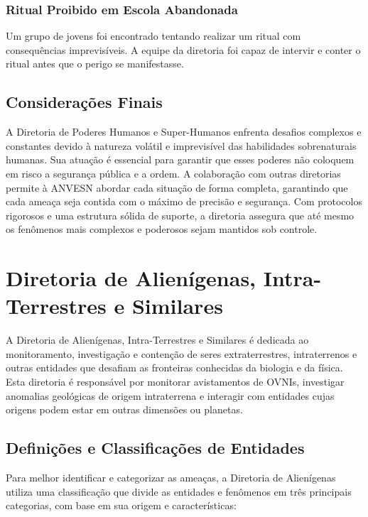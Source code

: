 \subsection{Ritual Proibido em Escola Abandonada}
Um grupo de jovens foi encontrado tentando realizar um ritual com consequências imprevisíveis. A equipe da diretoria foi capaz de intervir e conter o ritual antes que o perigo se manifestasse.

\section{Considerações Finais}

A Diretoria de Poderes Humanos e Super-Humanos enfrenta desafios complexos e constantes devido à natureza volátil e imprevisível das habilidades sobrenaturais humanas. Sua atuação é essencial para garantir que esses poderes não coloquem em risco a segurança pública e a ordem. A colaboração com outras diretorias permite à ANVESN abordar cada situação de forma completa, garantindo que cada ameaça seja contida com o máximo de precisão e segurança. Com protocolos rigorosos e uma estrutura sólida de suporte, a diretoria assegura que até mesmo os fenômenos mais complexos e poderosos sejam mantidos sob controle.



\chapter{Diretoria de Alienígenas, Intra-Terrestres e Similares}
A Diretoria de Alienígenas, Intra-Terrestres e Similares é dedicada ao monitoramento, investigação e contenção de seres extraterrestres, intraterrenos e outras entidades que desafiam as fronteiras conhecidas da biologia e da física. Esta diretoria é responsável por monitorar avistamentos de OVNIs, investigar anomalias geológicas de origem intraterrena e interagir com entidades cujas origens podem estar em outras dimensões ou planetas.

\section{Definições e Classificações de Entidades}
Para melhor identificar e categorizar as ameaças, a Diretoria de Alienígenas utiliza uma classificação que divide as entidades e fenômenos em três principais categorias, com base em sua origem e características:

